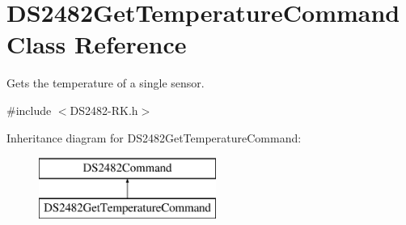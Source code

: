 \hypertarget{class_d_s2482_get_temperature_command}{}\section{D\+S2482\+Get\+Temperature\+Command Class Reference}
\label{class_d_s2482_get_temperature_command}


Gets the temperature of a single sensor.  




{\ttfamily \#include $<$D\+S2482-\/\+R\+K.\+h$>$}

Inheritance diagram for D\+S2482\+Get\+Temperature\+Command\+:\begin{figure}[H]
\begin{center}
\leavevmode
\includegraphics[height=2.000000cm]{class_d_s2482_get_temperature_command}
\end{center}
\end{figure}
